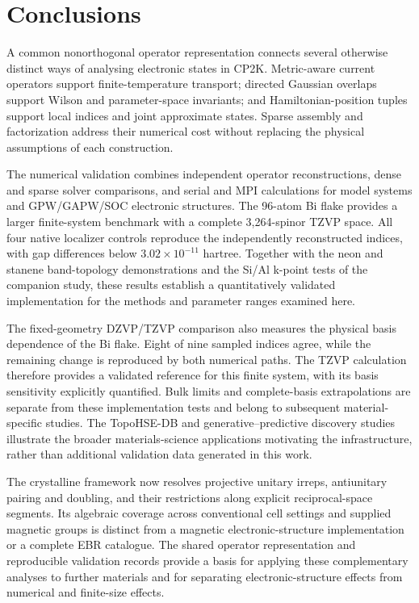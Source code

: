 \documentclass[11pt]{article}
\newcommand{\CPtwoK}{\textsc{CP2K}}
\numberwithin{equation}{section}
\begin{document}
\section{Conclusions}
A common nonorthogonal operator representation connects several
otherwise distinct ways of analysing electronic states in \CPtwoK.
Metric-aware current operators support finite-temperature transport;
directed Gaussian overlaps support Wilson and parameter-space
invariants; and Hamiltonian-position tuples support local indices and
joint approximate states. Sparse assembly and factorization address
their numerical cost without replacing the physical assumptions of
each construction.

The numerical validation combines independent operator reconstructions,
dense and sparse solver comparisons, and serial and MPI calculations
for model systems and GPW/GAPW/SOC electronic structures. The
96-atom Bi flake provides a larger finite-system benchmark with a
complete 3,264-spinor TZVP space. All four native localizer controls
reproduce the independently reconstructed indices, with gap differences
below $3.02\times10^{-11}$ hartree. Together with the neon and stanene
band-topology demonstrations and the Si/Al k-point tests of the companion
study, these results establish a quantitatively validated implementation
for the methods and parameter ranges examined here.

The fixed-geometry DZVP/TZVP comparison also measures the physical
basis dependence of the Bi flake. Eight of nine sampled indices agree,
while the remaining change is reproduced by both numerical paths.
The TZVP calculation therefore provides a validated reference for this
finite system, with its basis sensitivity explicitly quantified.
Bulk limits and complete-basis extrapolations are separate from these
implementation tests and belong to subsequent material-specific studies.
The TopoHSE-DB and generative--predictive
discovery studies illustrate the broader materials-science applications
motivating the infrastructure, rather than additional validation data
generated in this work.

The crystalline framework now resolves projective unitary irreps,
antiunitary pairing and doubling, and their restrictions along explicit
reciprocal-space segments. Its algebraic coverage across conventional
cell settings and supplied magnetic groups is distinct from a magnetic
electronic-structure implementation or a complete EBR catalogue.
The shared operator representation and reproducible validation records
provide a basis for applying these complementary analyses to further
materials and for separating electronic-structure effects from numerical
and finite-size effects.
\end{document}
